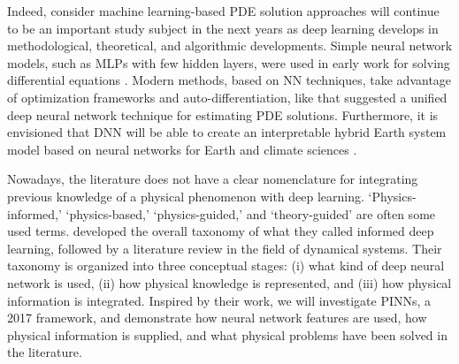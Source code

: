 \documentclass[pdflatex,sn-basic]{sn-jnl}%
\theoremstyle{thmstyleone}%
\theoremstyle{thmstyletwo}%
\theoremstyle{thmstylethree}%
\begin{document}
Indeed, \cite{Ble2021_ThreeWaysSolve_ErnBE} consider machine learning-based PDE solution approaches will continue to be an important study subject in the next years as deep learning develops in methodological, theoretical, and algorithmic developments. 
%
Simple neural network models, such as MLPs with few hidden layers, were used in early work for solving differential equations \citep{Lag1998_ArtificialNeuralNetworks_LikLLF}.
Modern methods, based on NN techniques, take advantage of optimization frameworks and auto-differentiation, like \cite{Ber2018_UnifiedDeepArtificial_NysBN} that suggested a unified deep neural network technique for estimating PDE solutions.
%
Furthermore, it is envisioned that DNN will be able to create an interpretable hybrid Earth system model based on neural networks for Earth and climate sciences \citep{Irr2021_TowardsNeuralEarth_BoeIBS}.





Nowadays, the literature does not have a clear nomenclature for integrating previous knowledge of a physical phenomenon with deep learning.
`Physics-informed,' `physics-based,' `physics-guided,' and `theory-guided' are often some used terms. \cite{Kim2021_KnowledgeIntegrationDeep_KimKKLL}  developed the overall taxonomy of what they called informed deep learning, followed by a literature review in the field of dynamical systems.
Their taxonomy is organized into three conceptual stages: (i) what kind of deep neural network is used, (ii) how physical knowledge is represented, and (iii) how physical information is integrated. 
Inspired by their work, we will investigate PINNs, a 2017 framework, and demonstrate how neural network features are used, how physical information is supplied, and what physical problems have been solved in the literature. %




\end{document}
